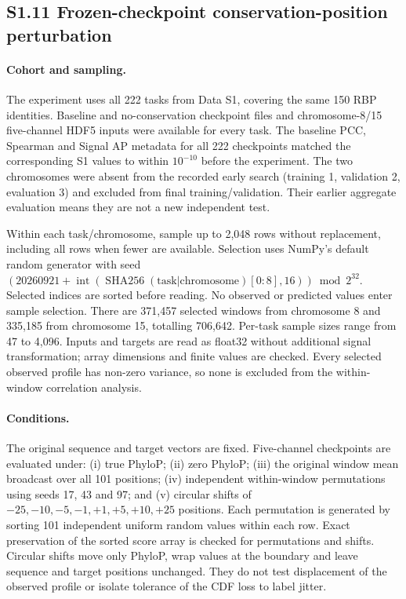 \documentclass[11pt]{article}
\begin{document}
\subsection*{S1.11 Frozen-checkpoint conservation-position perturbation}

\paragraph{Cohort and sampling.} The experiment uses all 222 tasks from Data S1, covering the same 150 RBP identities. Baseline and no-conservation checkpoint files and chromosome-8/15 five-channel HDF5 inputs were available for every task. The baseline PCC, Spearman and Signal AP metadata for all 222 checkpoints matched the corresponding S1 values to within $10^{-10}$ before the experiment. The two chromosomes were absent from the recorded early search (training 1, validation 2, evaluation 3) and excluded from final training/validation. Their earlier aggregate evaluation means they are not a new independent test.

Within each task/chromosome, sample up to 2,048 rows without replacement, including all rows when fewer are available. Selection uses NumPy's default random generator with seed $(20260921+\operatorname{int}(\operatorname{SHA256}(\text{task}| \text{chromosome})[0{:}8],16))\bmod2^{32}$. Selected indices are sorted before reading. No observed or predicted values enter sample selection. There are 371,457 selected windows from chromosome 8 and 335,185 from chromosome 15, totalling 706,642. Per-task sample sizes range from 47 to 4,096. Inputs and targets are read as float32 without additional signal transformation; array dimensions and finite values are checked. Every selected observed profile has non-zero variance, so none is excluded from the within-window correlation analysis.

\paragraph{Conditions.} The original sequence and target vectors are fixed. Five-channel checkpoints are evaluated under: (i) true PhyloP; (ii) zero PhyloP; (iii) the original window mean broadcast over all 101 positions; (iv) independent within-window permutations using seeds 17, 43 and 97; and (v) circular shifts of $-25,-10,-5,-1,+1,+5,+10,+25$ positions. Each permutation is generated by sorting 101 independent uniform random values within each row. Exact preservation of the sorted score array is checked for permutations and shifts. Circular shifts move only PhyloP, wrap values at the boundary and leave sequence and target positions unchanged. They do not test displacement of the observed profile or isolate tolerance of the CDF loss to label jitter.
\end{document}
